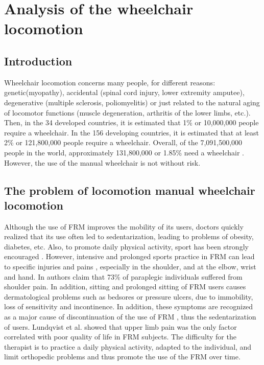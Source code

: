 \chapter{Analysis of the wheelchair locomotion}

\section{Introduction}
Wheelchair locomotion concerns many people, for different reasons: genetic(myopathy), accidental (spinal cord injury, lower extremity amputee), degenerative (multiple sclerosis, poliomyelitis) or just related to the natural aging of locomotor functions (muscle degeneration, arthritis of the lower limbs, etc.). Then, in the 34 developed countries, it is estimated that 1\% or 10,000,000 people require a wheelchair. In the 156 developing countries, it is estimated that at least 2\% or 121,800,000 people require a wheelchair. Overall, of the 7,091,500,000 people in the world, approximately 131,800,000 or 1.85\% need a wheelchair \cite{Needs2016}. However, the use of the manual wheelchair is not without risk.

\section{The problem of locomotion manual wheelchair locomotion}

Although the use of FRM improves the mobility of its users, doctors quickly realized that its use often led to sedentarization, leading to problems of obesity, diabetes, etc. Also, to promote daily physical activity, sport has been strongly encouraged \cite{machida2013resilience}. However, intensive and prolonged sports practice in FRM can lead to specific injuries and pains \cite{johnson2004sport}, especially in the shoulder, and at the elbow, wrist and hand. In \cite{pentland1991weight} authors claim that 73\%  of paraplegic individuals suffered from shoulder pain. In addition, sitting and prolonged sitting of FRM users causes dermatological problems such as bedsores or pressure ulcers, due to immobility, loss of sensitivity and incontinence. In addition, these symptoms are recognized as a major cause of discontinuation of the use of FRM \cite{van2006manual, ville2006work}, thus the sedentarization of users. Lundqvist et al. \cite{lundqvist1991spinal} showed that upper limb pain was the only factor correlated with poor quality of life in FRM subjects. The difficulty for the therapist is to practice a daily physical activity, adapted to the individual, and limit orthopedic problems and thus promote the use of the FRM over time.


